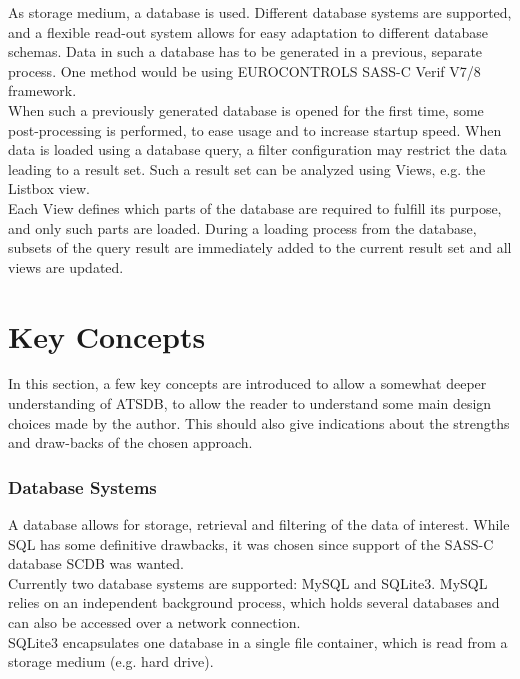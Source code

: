 \documentclass[10pt,letterpaper,extrafontsizes]{memoir}
\begin{document}
As storage medium, a database is used.  Different database systems are supported, and a flexible read-out system allows for easy adaptation to different database schemas.  Data in such a database has to be generated in a previous, separate process.  One method would be using EUROCONTROLS SASS-C  Verif V7/8 framework.\\

When such a previously generated database is opened for the first time, some post-processing is performed, to ease usage and to increase startup speed.  When data is loaded using a database query, a filter configuration may restrict the data leading to a result set.  Such a result set can be analyzed using Views, e.g. the Listbox view.\\

Each View defines which parts of the database are required to fulfill its purpose, and only such parts are loaded.  During a loading process from the database, subsets of the query result are immediately added to the current result set and all views are updated.

\chapter{Key Concepts}
\label{cha:key_concepts}

In this section, a few key concepts are introduced to allow a somewhat deeper understanding of ATSDB, to allow the reader to understand some main design choices made by the author. This should also give indications about the strengths and draw-backs of the chosen approach.

\subsection{Database Systems}
A database allows for storage, retrieval and filtering of the data of interest. While SQL has some definitive drawbacks, it was chosen since support of the SASS-C database SCDB was wanted.\\
Currently  two  database  systems  are  supported:  MySQL  and  SQLite3.   MySQL  relies  on  an  independent background process, which holds several databases and can also be accessed over a network connection.\\
SQLite3 encapsulates one database in a single file container, which is read from a storage medium (e.g. hard drive).
\end{document}
